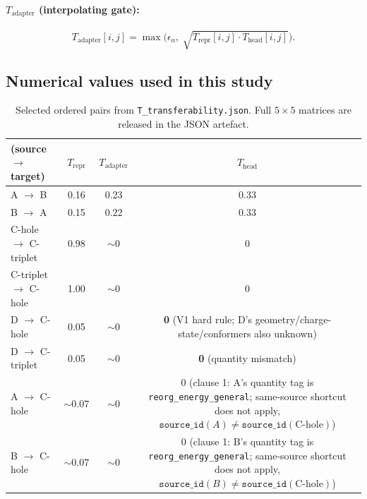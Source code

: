 \documentclass[11pt,a4paper]{article}
\begin{document}
\paragraph{$T_{\mathrm{adapter}}$ (interpolating gate):}
\[
T_{\mathrm{adapter}}[i, j] = \max\!\bigl(\epsilon_a,\;\sqrt{T_{\mathrm{repr}}[i, j] \cdot T_{\mathrm{head}}[i, j]}\bigr).
\]

\subsection{Numerical values used in this study}

\begin{table}[h]
\centering
\small
\caption{Selected ordered pairs from \texttt{T\_transferability.json}. Full $5\times 5$ matrices are released in the JSON artefact.}\label{tab:si:tmat}
\begin{tabular}{@{}lccc@{}}
\toprule
(source $\to$ target) & $T_{\mathrm{repr}}$ & $T_{\mathrm{adapter}}$ & $T_{\mathrm{head}}$ \\
\midrule
A $\to$ B                 & 0.16 & 0.23 & 0.33 \\
B $\to$ A                 & 0.15 & 0.22 & 0.33 \\
C-hole $\to$ C-triplet    & 0.98 & $\sim 0$ & 0 \\
C-triplet $\to$ C-hole    & 1.00 & $\sim 0$ & 0 \\
D $\to$ C-hole            & 0.05 & $\sim 0$ & \textbf{0} (V1 hard rule; D's geometry/charge-state/conformers also unknown) \\
D $\to$ C-triplet         & 0.05 & $\sim 0$ & \textbf{0} (quantity mismatch) \\
A $\to$ C-hole            & $\sim 0.07$ & $\sim 0$ & 0 (clause 1: A's quantity tag is \texttt{reorg\_energy\_general}; same-source shortcut does not apply, $\texttt{source\_id}(A) \neq \texttt{source\_id}(\textrm{C-hole})$) \\
B $\to$ C-hole            & $\sim 0.07$ & $\sim 0$ & 0 (clause 1: B's quantity tag is \texttt{reorg\_energy\_general}; same-source shortcut does not apply, $\texttt{source\_id}(B) \neq \texttt{source\_id}(\textrm{C-hole})$) \\
\bottomrule
\end{tabular}
\end{table}
\end{document}
